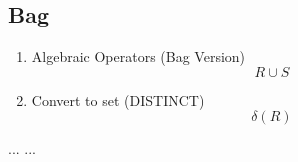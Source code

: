 \documentclass{article}
\begin{document}
\subsection{Bag}
\begin{enumerate}
\item Algebraic Operators (Bag Version)
$$
R\cup S
$$
\item Convert to set (DISTINCT)
$$
\delta(R)
$$
\end{enumerate}

\begin{thebibliography}{99}
 ...
 ...
\end{thebibliography}
\end{document}
